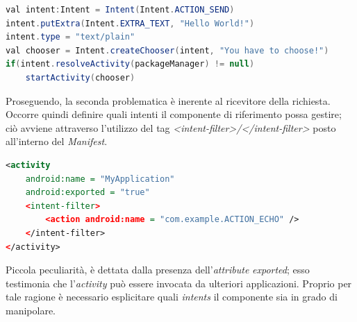 \documentclass{article}
\begin{document}
\begin{lstlisting}[language=JAVA, title=Inserimento dell'elemento chooser]
val intent:Intent = Intent(Intent.ACTION_SEND)
intent.putExtra(Intent.EXTRA_TEXT, "Hello World!")
intent.type = "text/plain"
val chooser = Intent.createChooser(intent, "You have to choose!")
if(intent.resolveActivity(packageManager) != null) 
    startActivity(chooser)
\end{lstlisting}
Proseguendo, la seconda problematica è inerente al ricevitore della richiesta. Occorre quindi definire quali intenti il componente di riferimento possa gestire; ciò avviene attraverso l'utilizzo del tag \textit{<intent-filter>/</intent-filter>} posto all'interno del \textit{Manifest}.
\begin{lstlisting}[language=XML, title=Inserimento dell'intent-filter nel Manifest]
<activity
    android:name = "MyApplication"
    android:exported = "true"
    <intent-filter>
        <action android:name = "com.example.ACTION_ECHO" />
    </intent-filter>
</activity>
\end{lstlisting}    
Piccola peculiarità, è dettata dalla presenza dell'\textit{attribute} \textit{exported}; esso testimonia che l'\textit{activity} può essere invocata da ulteriori applicazioni. Proprio per tale ragione è necessario esplicitare quali \textit{intents} il componente sia in grado di manipolare.
\end{document}
